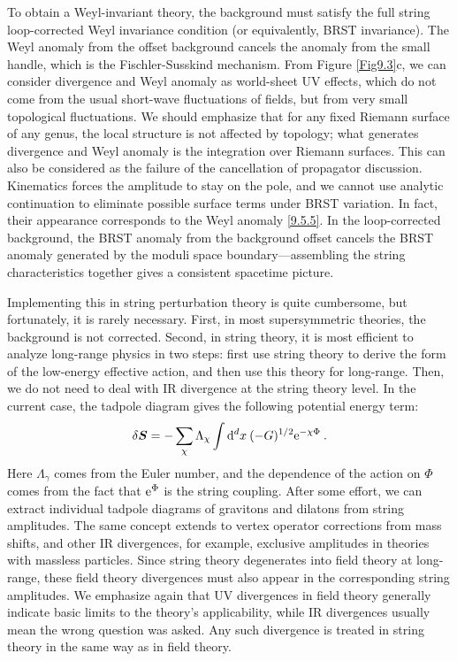 To obtain a Weyl-invariant theory, the background must satisfy the full string loop-corrected Weyl invariance condition (or equivalently, BRST invariance). 
The Weyl anomaly from the offset background cancels the anomaly from the small handle, which is the Fischler-Susskind mechanism. From Figure \ref{Fig9.3}c, we can consider divergence and Weyl anomaly as world-sheet UV effects, 
which do not come from the usual short-wave fluctuations of fields, but from very small topological fluctuations. We should emphasize that for any fixed Riemann surface of any genus, the local structure is not affected by topology; 
what generates divergence and Weyl anomaly is the integration over Riemann surfaces.
This can also be considered as the failure of the cancellation of propagator discussion. Kinematics forces the amplitude to stay on the pole, and we cannot use analytic continuation to eliminate possible surface terms under BRST variation. 
In fact, their appearance corresponds to the Weyl anomaly \eqref{9.5.5}. In the loop-corrected background, the BRST anomaly from the background offset cancels the BRST anomaly generated by the moduli space boundary—assembling the string characteristics together gives a consistent spacetime picture.

Implementing this in string perturbation theory is quite cumbersome, but fortunately, it is rarely necessary. First, in most supersymmetric theories, the background is not corrected. 
Second, in string theory, it is most efficient to analyze long-range physics in two steps: first use string theory to derive the form of the low-energy effective action, and then use this theory for long-range. 
Then, we do not need to deal with IR divergence at the string theory level.
In the current case, the tadpole diagram gives the following potential energy term:
\begin{equation}
	\delta \bm{S}=-\sum_{\chi} \Lambda_{\chi} \int \mathrm{d}^{d} x \: (-G)^{1/2} \mathrm{e}^{-\chi \Phi} \:. \label{9.5.6}
\end{equation}
Here $\Lambda_{\gamma}$ comes from the Euler number, and the dependence of the action on $\Phi$ comes from the fact that $\mathrm{e}^{\Phi}$ is the string coupling. 
After some effort, we can extract individual tadpole diagrams of gravitons and dilatons from string amplitudes.
The same concept extends to vertex operator corrections from mass shifts, and other IR divergences, for example, exclusive amplitudes in theories with massless particles. Since string theory degenerates into field theory at long-range, 
these field theory divergences must also appear in the corresponding string amplitudes. We emphasize again that UV divergences in field theory generally indicate basic limits to the theory's applicability, while IR divergences usually mean the wrong question was asked. 
Any such divergence is treated in string theory in the same way as in field theory.

